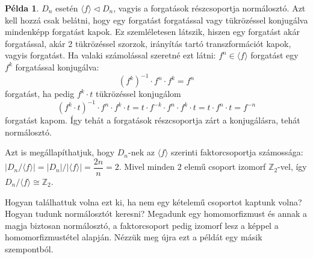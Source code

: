 \documentclass[12pt]{book}
\theoremstyle{plain} %
\theoremstyle{definition} %
\newtheorem{pl}{Példa}[section]
\theoremstyle{remark}
\numberwithin{equation}{section}  %
\def\Z{\mathbb{Z}}
\begin{document}
	\begin{pl}
		$D_n$ esetén $\langle f \rangle \triangleleft D_n$, vagyis a forgatások részcsoportja normálosztó. Azt kell hozzá csak belátni, hogy egy forgatást forgatással vagy tükrözéssel konjugálva mindenképp forgatást kapok. Ez szemléletesen látszik, hiszen egy forgatást akár forgatással, akár 2 tükrözéssel szorzok, irányítás tartó transzformációt kapok, vagyis forgatást. Ha valaki számolással szeretné ezt látni: $f^n \in \langle f \rangle$ forgatást egy $f^k$ forgatással konjugálva:
		\[ \left(f^k\right)^{-1}  \cdot f^n \cdot f^k = f^n  \]
		forgatást, ha pedig $f^k \cdot t$ tükrözéssel konjugálom
		\[ \left(f^k \cdot t\right)^{-1} \cdot f^n \cdot f^k \cdot t = t\cdot f^{-k} \cdot f^n \cdot f^k \cdot t = t\cdot f^n \cdot t = f^{-n}  \]
		forgatást kapom. Így tehát a forgatások részcsoportja zárt a konjugálásra, tehát normálosztó.
		
		Azt is megállapíthatjuk, hogy $D_n$-nek az $\langle f \rangle$ szerinti faktorcsoportja számossága: $|D_n/\langle f\rangle| = |D_n|/|\langle f \rangle| = \dfrac{2n}{n} = 2$. Mivel minden $2$ elemű csoport izomorf $\Z_2$-vel, így $D_n / \langle f \rangle \cong \Z_2$.
	\end{pl}

	Hogyan találhattuk volna ezt ki, ha nem egy kételemű csoportot kaptunk volna? Hogyan tudunk normálosztót keresni? Megadunk egy homomorfizmust és annak a magja biztosan normálosztó, a faktorcsoport pedig izomorf lesz a képpel a homomorfizmustétel alapján. Nézzük meg újra ezt a példát egy másik szempontból.
	
\end{document}
